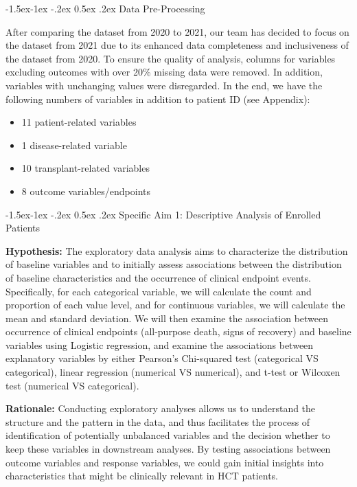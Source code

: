 \documentclass[11pt,]{article}
\makeatletter
\renewcommand\subsection{
  \@startsection{subsection}{2}{\z@}
    {-1.5ex\@plus -1ex \@minus -.2ex}%
    {0.5ex \@plus .2ex}%
    {\normalfont\normalsize\bf}} %
\makeatother
\begin{document}
\hypertarget{data-pre-processing}{%
\subsection{Data Pre-Processing}\label{data-pre-processing}}

After comparing the dataset from 2020 to 2021, our team has decided to
focus on the dataset from 2021 due to its enhanced data completeness and
inclusiveness of the dataset from 2020. To ensure the quality of
analysis, columns for variables excluding outcomes with over 20\%
missing data were removed. In addition, variables with unchanging values
were disregarded. In the end, we have the following numbers of variables
in addition to patient ID (see Appendix):

\begin{itemize}
\item
  11 patient-related variables
\item
  1 disease-related variable
\item
  10 transplant-related variables
\item
  8 outcome variables/endpoints
\end{itemize}

\hypertarget{specific-aim-1-descriptive-analysis-of-enrolled-patients}{%
\subsection{Specific Aim 1: Descriptive Analysis of Enrolled
Patients}\label{specific-aim-1-descriptive-analysis-of-enrolled-patients}}

\textbf{Hypothesis:} The exploratory data analysis aims to characterize
the distribution of baseline variables and to initially assess
associations between the distribution of baseline characteristics and
the occurrence of clinical endpoint events. Specifically, for each
categorical variable, we will calculate the count and proportion of each
value level, and for continuous variables, we will calculate the mean
and standard deviation. We will then examine the association between
occurrence of clinical endpoints (all-purpose death, signs of recovery)
and baseline variables using Logistic regression, and examine the
associations between explanatory variables by either Pearson's
Chi-squared test (categorical VS categorical), linear regression
(numerical VS numerical), and t-test or Wilcoxen test (numerical VS
categorical).

\textbf{Rationale:} Conducting exploratory analyses allows us to
understand the structure and the pattern in the data, and thus
facilitates the process of identification of potentially unbalanced
variables and the decision whether to keep these variables in downstream
analyses. By testing associations between outcome variables and response
variables, we could gain initial insights into characteristics that
might be clinically relevant in HCT patients.
\end{document}
